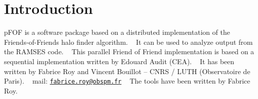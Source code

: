 \hypertarget{index_intro_sec}{}\section{Introduction}\label{index_intro_sec}
p\+F\+OF is a software package based on a distributed implementation of the Friends-\/of-\/\+Friends halo finder algorithm. ~\newline
 It can be used to analyze output from the R\+A\+M\+S\+ES code. ~\newline
 This parallel Friend of Friend implementation is based on a sequential implementation written by Edouard Audit (C\+EA). ~\newline
 It has been written by Fabrice Roy and Vincent Bouillot -- C\+N\+RS / L\+U\+TH (Observatoire de Paris). ~\newline
 mail\+: \href{mailto:fabrice.roy@obspm.fr}{\tt fabrice.\+roy@obspm.\+fr} ~\newline
 The tools have been written by Fabrice Roy. ~\newline


